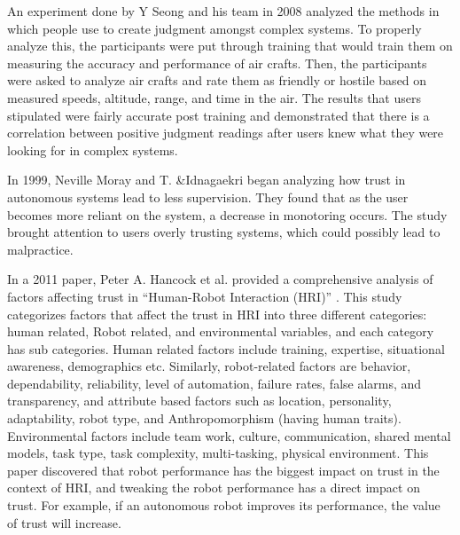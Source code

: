 \documentclass[runningheads,a4paper]{llncs}
\begin{document}
An experiment done by Y Seong and his team in 2008 analyzed the methods in which people use to create judgment amongst complex systems\cite{seong2008impact}.  To properly analyze this, the participants were put through training that would train them on measuring the accuracy and performance of air crafts.  Then, the participants were asked to analyze air crafts and rate them as friendly or hostile based on measured speeds, altitude, range, and time in the air.  The results that users stipulated were fairly accurate post training and demonstrated that there is a correlation between positive judgment readings after users knew what they were looking for in complex systems.

In 1999, Neville Moray and T. &Idnagaekri began analyzing how trust in autonomous systems lead to less supervision\cite{moray1999laboratory}.  They found that as the user becomes more reliant on the system, a decrease in monotoring occurs.  The study brought attention to users overly trusting systems, which could possibly lead to malpractice. 

In a 2011 paper, Peter A. Hancock et al. provided a comprehensive analysis of factors affecting trust in ``Human-Robot Interaction (HRI)'' \cite{hancock2011meta}. This study categorizes factors that affect the trust in HRI into three different categories: human related, Robot related, and environmental variables, and each category has sub categories. Human related factors include training, expertise, situational awareness, demographics etc. Similarly, robot-related factors are behavior, dependability, reliability, level of automation, failure rates, false alarms, and transparency, and attribute based factors such as location, personality, adaptability, robot type, and Anthropomorphism (having human traits). Environmental factors include team work, culture, communication, shared mental models, task type, task complexity, multi-tasking, physical environment. This paper discovered that robot performance has the biggest impact on trust in the context of HRI, and tweaking the robot performance has a direct impact on trust. For example, if an autonomous robot improves its performance, the value of trust will increase.
\end{document}
